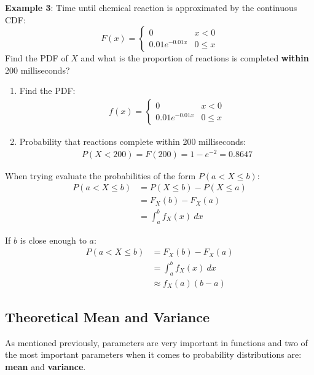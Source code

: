 \documentclass[10pt,a4paper]{article}
\begin{document}
\pagebreak


\textbf{Example 3}: Time until chemical reaction is approximated by the continuous CDF:
$$
    F(x) = 
    \begin{cases}
        0 & x<0 \\
        0.01e^{-0.01x} & 0 \leq x   
    \end{cases}
$$
Find the PDF of $X$ and what is the proportion of reactions is completed \textbf{within} 200
milliseconds?
\begin{enumerate}
    \item Find the PDF:
    \begin{align*}
        f(x) = 
        \begin{cases}
            0 & x < 0 \\
            0.01e^{-0.01x} & 0 \leq x    
        \end{cases}
    \end{align*}
    \item Probability that reactions complete within 200 milliseconds:
    \begin{align*}
        P(X<200) = F(200) = 1 - e^{-2} = 0.8647
    \end{align*}
\end{enumerate}

When trying evaluate the probabilities of the form $P(a < X \leq b)$:
\begin{align*}
    P(a<X\leq b) &= P(X\leq b) - P(X \leq a) \\
    &= F_X(b) - F_X(a) \\
    &= \int_a^b f_X(x) \: dx
\end{align*}

If $b$ is close enough to $a$:
\begin{align*}
    P(a<X\leq b) &= F_X(b) - F_X(a) \\
    &= \int_a^b f_X(x)\: dx \\
    &\approx f_X(a)(b-a)
\end{align*}

\pagebreak

\subsection{Theoretical Mean and Variance}

As mentioned previously, parameters are very important in functions and two of the most important
parameters when it comes to probability distributions are: \textbf{mean} and \textbf{variance}.
\end{document}
